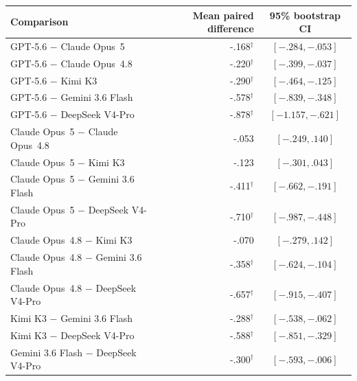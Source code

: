 \begin{center}
\begin{minipage}{\linewidth}
\centering
{}
\label{tab:coin-city-pairwise}
\small
\begin{tabular}{l r c}
\toprule
Comparison & Mean paired difference & 95\% bootstrap CI \\
\midrule
GPT-5.6 $-$ Claude Opus~5 & -.168$^{\dagger}$ & $[-.284,-.053]$ \\
GPT-5.6 $-$ Claude Opus~4.8 & -.220$^{\dagger}$ & $[-.399,-.037]$ \\
GPT-5.6 $-$ Kimi K3 & -.290$^{\dagger}$ & $[-.464,-.125]$ \\
GPT-5.6 $-$ Gemini 3.6 Flash & -.578$^{\dagger}$ & $[-.839,-.348]$ \\
GPT-5.6 $-$ DeepSeek V4-Pro & -.878$^{\dagger}$ & $[-1.157,-.621]$ \\
Claude Opus~5 $-$ Claude Opus~4.8 & -.053 & $[-.249,.140]$ \\
Claude Opus~5 $-$ Kimi K3 & -.123 & $[-.301,.043]$ \\
Claude Opus~5 $-$ Gemini 3.6 Flash & -.411$^{\dagger}$ & $[-.662,-.191]$ \\
Claude Opus~5 $-$ DeepSeek V4-Pro & -.710$^{\dagger}$ & $[-.987,-.448]$ \\
Claude Opus~4.8 $-$ Kimi K3 & -.070 & $[-.279,.142]$ \\
Claude Opus~4.8 $-$ Gemini 3.6 Flash & -.358$^{\dagger}$ & $[-.624,-.104]$ \\
Claude Opus~4.8 $-$ DeepSeek V4-Pro & -.657$^{\dagger}$ & $[-.915,-.407]$ \\
Kimi K3 $-$ Gemini 3.6 Flash & -.288$^{\dagger}$ & $[-.538,-.062]$ \\
Kimi K3 $-$ DeepSeek V4-Pro & -.588$^{\dagger}$ & $[-.851,-.329]$ \\
Gemini 3.6 Flash $-$ DeepSeek V4-Pro & -.300$^{\dagger}$ & $[-.593,-.006]$ \\
\bottomrule
\end{tabular}
\end{minipage}
\end{center}

